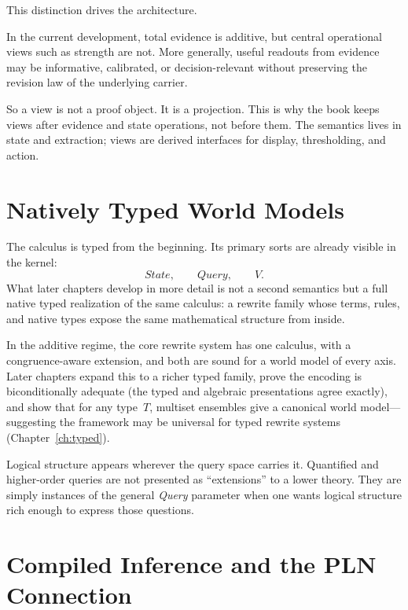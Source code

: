 \documentclass[11pt,openany]{report}
\begin{document}
This distinction drives the architecture.

\begin{proposition}
\label{prop:overview-views-not-semantic-core}
In the current development, total evidence is additive, but central operational
views such as strength are not.  More generally, useful readouts from evidence
may be informative, calibrated, or decision-relevant without preserving the
revision law of the underlying carrier.
\end{proposition}

So a view is not a proof object.  It is a projection.  This is why the book keeps
views after evidence and state operations, not before them.  The semantics lives
in state and extraction; views are derived interfaces for display, thresholding,
and action.

\section{Natively Typed World Models}
\label{sec:overview-typed}

The calculus is typed from the beginning.  Its primary sorts are already
visible in the kernel:
\[
  \textit{State}, \qquad \textit{Query}, \qquad V.
\]
What later chapters develop in more detail is not a second semantics but a
full native typed realization of the same calculus: a rewrite family whose
terms, rules, and native types expose the same mathematical structure from
inside.

In the additive regime, the core rewrite system has one calculus, with a
congruence-aware extension, and both are sound for a world model of every
axis.  Later chapters expand this to a richer typed
family, prove the encoding is biconditionally adequate (the typed
and algebraic presentations agree exactly), and show that for any
type~$T$, multiset ensembles give a canonical world
model---suggesting the framework may be universal for typed
rewrite systems (Chapter~\ref{ch:typed}).

Logical structure appears wherever the query space carries it.  Quantified and
higher-order queries are not presented as ``extensions'' to a lower theory.
They are simply instances of the general \textit{Query} parameter when one wants
logical structure rich enough to express those questions.

\section{Compiled Inference and the PLN Connection}
\label{sec:overview-compiled}
\end{document}
